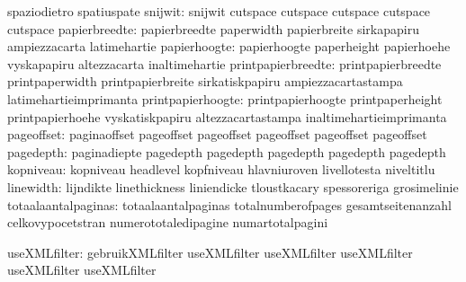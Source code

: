                                   spaziodietro                     spatiuspate %
                         snijwit: snijwit                          cutspace
                                  cutspace                         cutspace
                                  cutspace                         cutspace %
                   papierbreedte: papierbreedte                    paperwidth
                                  papierbreite                     sirkapapiru
                                  ampiezzacarta                    latimehartie
                    papierhoogte: papierhoogte                     paperheight
                                  papierhoehe                      vyskapapiru
                                  altezzacarta                     inaltimehartie
              printpapierbreedte: printpapierbreedte               printpaperwidth
                                  printpapierbreite                sirkatiskpapiru
                                  ampiezzacartastampa              latimehartieimprimanta %
               printpapierhoogte: printpapierhoogte                printpaperheight
                                  printpapierhoehe                 vyskatiskpapiru
                                  altezzacartastampa               inaltimehartieimprimanta  %
                      pageoffset: paginaoffset                     pageoffset
                                  pageoffset                       pageoffset
                                  pageoffset                       pageoffset
                       pagedepth: paginadiepte                     pagedepth
                                  pagedepth                        pagedepth
                                  pagedepth                        pagedepth
                       kopniveau: kopniveau                        headlevel
                                  kopfniveau                       hlavniuroven
                                  livellotesta                     niveltitlu %
                       linewidth: lijndikte                        linethickness
                                  liniendicke                      tloustkacary
                                  spessoreriga                     grosimelinie
             totaalaantalpaginas: totaalaantalpaginas              totalnumberofpages
                                  gesamtseitenanzahl               celkovypocetstran
                                  numerototaledipagine             numartotalpagini

                    useXMLfilter: gebruikXMLfilter                 useXMLfilter
                                  useXMLfilter                     useXMLfilter
                                  useXMLfilter                     useXMLfilter


